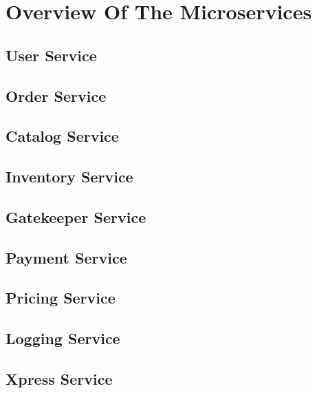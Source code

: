 

\section{Overview Of The Microservices}
\subsection{User Service}
\subsection{Order Service}
\subsection{Catalog Service}
\subsection{Inventory Service}
\subsection{Gatekeeper Service}
\subsection{Payment Service}
\subsection{Pricing Service}
\subsection{Logging Service}
\subsection{Xpress Service}
